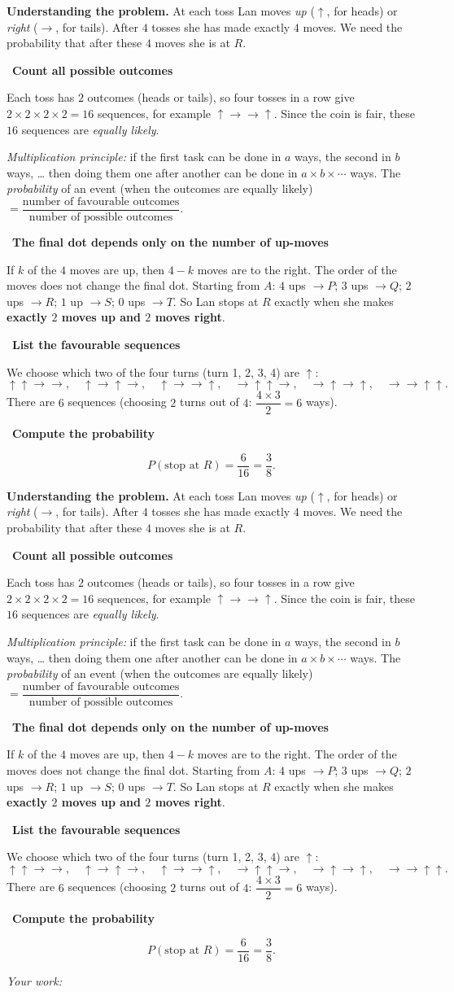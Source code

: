 \documentclass[11pt]{article}
\newif\ifsol \soltrue
\newcommand{\probsol}[1]{%
  \begin{lrbox}{\solmeasure}\begin{minipage}{\dimexpr\linewidth-24pt\relax}#1\end{minipage}\end{lrbox}%
  \ifsol
    \begin{solbox}#1\end{solbox}%
  \else
    \setlength{\solht}{\dimexpr\ht\solmeasure+\dp\solmeasure+0.85cm\relax}%
    \ifdim\solht<1.35cm\setlength{\solht}{1.35cm}\fi
    \ifdim\solht>\StudentMaxWork\setlength{\solht}{\StudentMaxWork}\fi
    \begin{tcolorbox}[colback=white,colframe=Line,boxrule=0.8pt,arc=5pt,
      left=8pt,right=8pt,top=4pt,bottom=4pt,height=\solht]{\footnotesize\color{Slate}\itshape\WorkWord}\end{tcolorbox}%
  \fi}
\newlength{\StudentMaxWork}\setlength{\StudentMaxWork}{7.5cm}
\newcommand{\step}[2]{\par\smallskip\noindent{\bfseries\color{tmBlue!85!black}\StepWord~#1.}\ {\bfseries #2}\par\nopagebreak}
\def\WorkWord{Your work:}
\def\StepWord{Step}
\begin{document}
\probsol{
\textbf{Understanding the problem.} At each toss Lan moves \emph{up} ($\uparrow$, for heads) or \emph{right}
($\rightarrow$, for tails). After $4$ tosses she has made exactly $4$ moves. We need the probability that after these
$4$ moves she is at $R$.

\step{1}{Count all possible outcomes}
Each toss has $2$ outcomes (heads or tails), so four tosses in a row give
$2\times2\times2\times2=16$ sequences, for example $\uparrow\rightarrow\rightarrow\uparrow$.
Since the coin is fair, these $16$ sequences are \emph{equally likely}.
\begin{recallbox}\emph{Multiplication principle:} if the first task can be done in $a$ ways, the second in $b$ ways, \dots{} then
doing them one after another can be done in $a\times b\times\cdots$ ways. The \emph{probability} of an event (when the outcomes
are equally likely) $=\dfrac{\text{number of favourable outcomes}}{\text{number of possible outcomes}}$.\end{recallbox}

\step{2}{The final dot depends only on the number of up-moves}
If $k$ of the $4$ moves are up, then $4-k$ moves are to the right. The order of the moves does not change the final dot.
Starting from $A$: $4$ ups $\to P$; $3$ ups $\to Q$; $2$ ups $\to R$; $1$ up $\to S$; $0$ ups $\to T$.
So Lan stops at $R$ exactly when she makes \textbf{exactly $2$ moves up and $2$ moves right}.

\step{3}{List the favourable sequences}
We choose which two of the four turns (turn 1, 2, 3, 4) are $\uparrow$:
\[\uparrow\uparrow\rightarrow\rightarrow,\quad \uparrow\rightarrow\uparrow\rightarrow,\quad
\uparrow\rightarrow\rightarrow\uparrow,\quad \rightarrow\uparrow\uparrow\rightarrow,\quad
\rightarrow\uparrow\rightarrow\uparrow,\quad \rightarrow\rightarrow\uparrow\uparrow.\]
There are $6$ sequences (choosing $2$ turns out of $4$: $\dfrac{4\times3}{2}=6$ ways).

\step{4}{Compute the probability}
\[P(\text{stop at } R)=\frac{6}{16}=\frac38.\]

}
\end{document}
